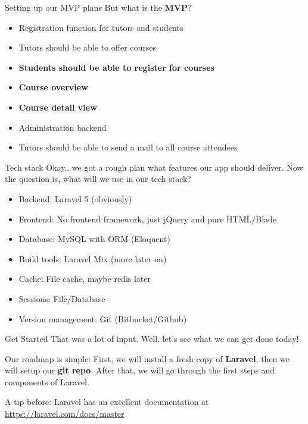 \begin{frame}{Setting up our MVP plans}
	But what is the \textbf{MVP}?\pause
	\begin{itemize}
		\item Registration function for tutors and students \pause			
		\item Tutors should be able to offer courses \pause	
		\item \textbf{Students should be able to register for courses} \pause
		\item \textbf{Course overview} \pause			
		\item \textbf{Course detail view}\pause	
		\item Administration backend \pause	
		\item Tutors should be able to send a mail to all course attendees
	\end{itemize}
\end{frame}

\begin{frame}{Tech stack}
	Okay.. we got a rough plan what features our app should deliver. Now the question is, what will we use in our tech stack?
	\begin{itemize}
		\item Backend: \pause Laravel 5 (obviously)\pause	
		\item Frontend: \pause No frontend framework, just jQuery and pure HTML/Blade \pause
		\item Database: \pause MySQL with ORM (Eloquent) \pause	
		\item Build tools: \pause Laravel Mix (more later on) \pause
		\item Cache: \pause File cache, maybe redis later \pause
		\item Sessions: \pause File/Database \pause		
		\item Version management: Git (Bitbucket/Github)
	\end{itemize}
\end{frame}

\begin{frame}{Get Started}
	That was a lot of input. Well, let's see what we can get done today! \pause
	
	Our roadmap is simple: First, we will install a fresh copy of \textbf{Laravel}, then we will setup our \textbf{git repo}. After that, we will go through the first steps and components of Laravel. \pause
	
	A tip before: Laravel has an excellent documentation at \url{https://laravel.com/docs/master}
\end{frame}


